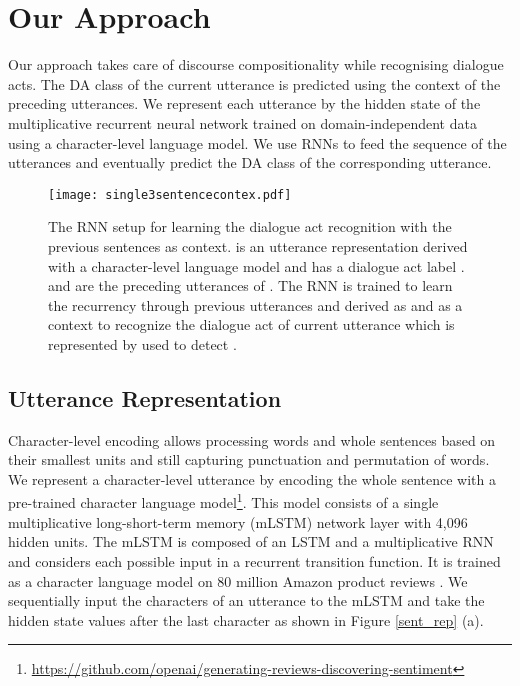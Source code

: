 \documentclass[10pt, a4paper]{article}
\begin{document}
\section{Our Approach}

Our approach takes care of discourse compositionality while recognising dialogue acts.
The DA class of the current utterance is predicted using the context of the preceding utterances.
We represent each utterance by the hidden state of the multiplicative recurrent neural network trained on domain-independent data using a character-level language model.
We use RNNs to feed the sequence of the utterances and eventually predict the DA class of the corresponding utterance.



\begin{figure}[t]
\begin{center}
\texttt{[image: single3sentencecontex.pdf]} 
\caption{The RNN setup for learning the dialogue act recognition with
the previous sentences as context. 
 is an utterance representation derived with a character-level language model and has a dialogue act label . 
 and   are the preceding utterances of  . 
The RNN is trained to learn the recurrency through previous utterances  and   derived as  and  as a context to recognize the dialogue act of current utterance  which is represented by  used to detect .}
\label{rnn_setup}
\end{center}
\end{figure}

\subsection{Utterance Representation}

Character-level encoding allows processing words and whole sentences based on their smallest units and still capturing punctuation and permutation of words.
We represent a character-level utterance by encoding the whole sentence with a pre-trained character language model\footnote{\url{https://github.com/openai/generating-reviews-discovering-sentiment}}. 
This model consists of a single multiplicative long-short-term memory (mLSTM) network \cite{krause2016multiplicative} layer with 4,096 hidden units. 
The mLSTM is composed of an LSTM and a multiplicative RNN and considers each possible input in a recurrent transition function.
It is trained as a character language model on 80 million Amazon product reviews 
\cite{Radford2017LearningSentiment}.
We sequentially input the characters of an utterance to the mLSTM and take the hidden state values after the last character as shown in Figure \ref{sent_rep} (a). 
\end{document}
